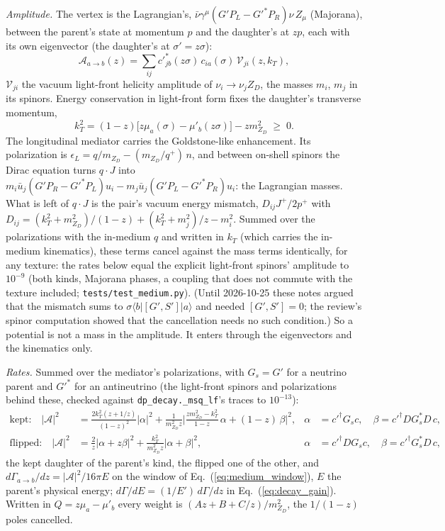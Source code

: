 \documentclass[11pt,a4paper]{article}
\newcommand{\file}[1]{\nolinkurl{#1}}
\newcommand{\mzd}{m_{Z_D}}
\begin{document}
\emph{Amplitude.} The vertex is the Lagrangian's, $\bar\nu\gamma^\mu(G'P_L - G'^*P_R)\nu\,Z_\mu$ (Majorana), between
the parent's state at momentum $p$ and the daughter's at $zp$, each with its own eigenvector (the daughter's at
$\sigma' = z\sigma$):
\begin{equation}
\mathcal{A}_{a\to b}(z) = \sum_{ij}c'^*_{jb}(z\sigma)\,c_{ia}(\sigma)\,\mathcal{V}_{ji}(z, k_T),
\label{eq:medium_amp}
\end{equation}
$\mathcal{V}_{ji}$ the vacuum light-front helicity amplitude of $\nu_i\to\nu_jZ_D$, the masses $m_i$, $m_j$ in its
spinors. Energy conservation in light-front form fixes the daughter's transverse momentum,
\begin{equation}
k_T^2 = (1-z)\big[z\mu_a(\sigma) - \mu'_b(z\sigma)\big] - z\mzd^2 \;\ge\; 0 .
\label{eq:medium_window}
\end{equation}
The longitudinal mediator carries the Goldstone-like enhancement. Its polarization is
$\epsilon_L = q/\mzd - (\mzd/q^+)\,n$, and between on-shell spinors the Dirac equation turns $q\cdot J$ into
$m_i\bar u_j(G'P_R - G'^*P_L)u_i - m_j\bar u_j(G'P_L - G'^*P_R)u_i$: the Lagrangian masses. What is left of $q\cdot J$
is the pair's vacuum energy mismatch, $D_{ij}J^+/2p^+$ with
$D_{ij} = (k_T^2+\mzd^2)/(1-z) + (k_T^2+m_j^2)/z - m_i^2$. Summed over the polarizations with the in-medium $q$ and
written in $k_T$ (which carries the in-medium kinematics), these terms cancel against the mass terms identically, for
any texture: the rates below equal the explicit light-front spinors' amplitude to $10^{-9}$ (both kinds, Majorana
phases, a coupling that does not commute with the texture included; \file{tests/test\_medium.py}). (Until 2026-10-25
these notes argued that the mismatch sums to $\sigma\langle b|[G', S']|a\rangle$ and needed $[G', S'] = 0$; the
review's spinor computation showed that the cancellation needs no such condition.) So a potential is not a mass in the
amplitude. It enters
through the eigenvectors and the kinematics only.

\emph{Rates.} Summed over the mediator's polarizations, with $G_s = G'$ for a neutrino parent and $G'^*$ for an
antineutrino (the light-front spinors and polarizations behind these, checked against
\texttt{dp\_decay.\_msq\_lf}'s traces to $10^{-13}$):
\begin{align}
\text{kept:}\quad |\mathcal{A}|^2 &= \frac{2k_T^2(z + 1/z)}{(1-z)^2}|\alpha|^2
 + \frac{1}{\mzd^2z}\Big|\frac{z\mzd^2 - k_T^2}{1-z}\,\alpha + (1-z)\,\beta\Big|^2,
 &\alpha &= c'^\dagger G_sc,\quad \beta = c'^\dagger DG_s^*D\,c, \nonumber\\
\text{flipped:}\quad |\mathcal{A}|^2 &= \frac{2}{z}|\alpha + z\beta|^2 + \frac{k_T^2}{\mzd^2z}|\alpha + \beta|^2,
 &\alpha &= c'^\dagger DG_sc,\quad \beta = c'^\dagger G_s^*D\,c,
\label{eq:medium_rates}
\end{align}
the kept daughter of the parent's kind, the flipped one of the other, and
$d\Gamma_{a\to b}/dz = |\mathcal{A}|^2/16\pi E$ on the window of Eq.~(\ref{eq:medium_window}), $E$ the parent's
physical energy; $d\Gamma/dE = (1/E')\,d\Gamma/dz$ in Eq.~(\ref{eq:decay_gain}). Written in
$Q = z\mu_a - \mu'_b$ every weight is $(Az + B + C/z)/\mzd^2$, the $1/(1-z)$ poles cancelled.
\end{document}
